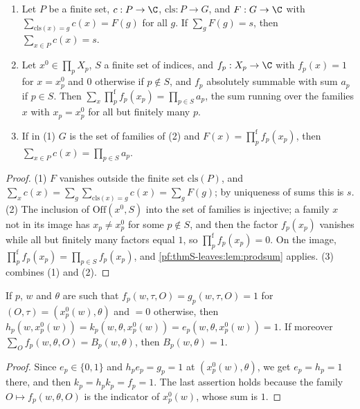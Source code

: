 \begin{lemma}\label{pf:thmS-leaves:lem:summation}
\begin{enumerate}
\item Let $P$ be a finite set, $c:P\to\C$, $\mathrm{cls}:P\to G$, and $F:G\to\C$ with $\sum_{\mathrm{cls}(x)=g}c(x)=F(g)$ for all
$g$. If $\sum_gF(g)=s$, then $\sum_{x\in P}c(x)=s$.
\item Let $x^0\in\prod_pX_p$, $S$ a finite set of indices, and $f_p:X_p\to\C$ with $f_p(x)=1$ for $x=x^0_p$ and $0$ otherwise
if $p\notin S$, and $f_p$ absolutely summable with sum $a_p$ if $p\in S$. Then $\sum_x\prod^{\mathrm f}_pf_p(x_p)=\prod_{p\in S}a_p$,
the sum running over the families $x$ with $x_p=x^0_p$ for all but finitely many $p$.
\item If in (1) $G$ is the set of families of (2) and $F(x)=\prod^{\mathrm f}_pf_p(x_p)$, then $\sum_{x\in P}c(x)=\prod_{p\in S}a_p$.
\end{enumerate}
\end{lemma}

\begin{proof}
(1) $F$ vanishes outside the finite set $\mathrm{cls}(P)$, and $\sum_xc(x)=\sum_g\sum_{\mathrm{cls}(x)=g}c(x)=\sum_gF(g)$; by
uniqueness of sums this is $s$. (2) The inclusion of $\mathrm{Off}(x^0,S)$ into the set of families is injective; a family $x$
not in its image has $x_p\ne x^0_p$ for some $p\notin S$, and then the factor $f_p(x_p)$ vanishes while all but finitely many
factors equal $1$, so $\prod^{\mathrm f}_pf_p(x_p)=0$. On the image, $\prod^{\mathrm f}_pf_p(x_p)=\prod_{p\in S}f_p(x_p)$, and
\cref{pf:thmS-leaves:lem:prodsum} applies. (3) combines (1) and (2).
\end{proof}

\begin{lemma}\label{pf:thmS-leaves:lem:base}
If $p$, $w$ and $\theta$ are such that $f_p(w,\tau,O)=g_p(w,\tau,O)=1$ for $(O,\tau)=(x^0_p(w),\theta)$ and $=0$ otherwise, then
$h_p(w,x^0_p(w))=k_p(w,\theta,x^0_p(w))=e_p(w,\theta,x^0_p(w))=1$. If moreover $\sum_Of_p(w,\theta,O)=B_p(w,\theta)$, then
$B_p(w,\theta)=1$.
\end{lemma}

\begin{proof}
Since $e_p\in\{0,1\}$ and $h_pe_p=g_p=1$ at $(x^0_p(w),\theta)$, we get $e_p=h_p=1$ there, and then $k_p=h_pk_p=f_p=1$. The last
assertion holds because the family $O\mapsto f_p(w,\theta,O)$ is the indicator of $x^0_p(w)$, whose sum is $1$.
\end{proof}

